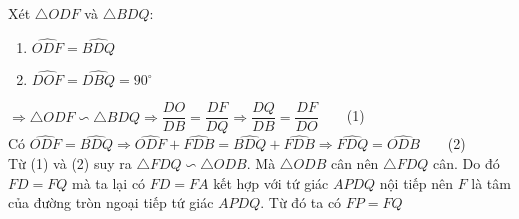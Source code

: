 \documentclass[12pt,a4paper]{article}
\begin{document}
Xét $\triangle{ODF}$ và $\triangle{BDQ}$:
\begin{enumerate}[ ]
	\item $\widehat{ODF}=\widehat{BDQ}$
	\item $\widehat{DOF}=\widehat{DBQ}=90^{\circ}$
\end{enumerate} 
$\Rightarrow\triangle{ODF}\backsim\triangle{BDQ}\Rightarrow\dfrac{DO}{DB}=\dfrac{DF}{DQ}\Rightarrow\dfrac{DQ}{DB}=\dfrac{DF}{DO}\qquad$(1)\\

Có $\widehat{ODF}=\widehat{BDQ}\Rightarrow\widehat{ODF}+\widehat{FDB}=\widehat{BDQ}+\widehat{FDB}\Rightarrow\widehat{FDQ}=\widehat{ODB}\qquad$(2)\\

Từ (1) và (2) suy ra $\triangle{FDQ}\backsim\triangle{ODB}$. Mà $\triangle{ODB}$ cân nên $\triangle{FDQ}$ cân. Do đó $FD=FQ$ mà ta lại có $FD=FA$ kết hợp với tứ giác $APDQ$ nội tiếp nên $F$ là tâm của đường tròn ngoại tiếp tứ giác $APDQ$. Từ đó ta có $FP=FQ$
\end{document}
